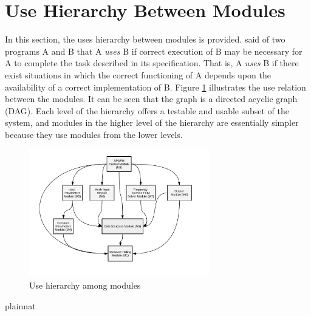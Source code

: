 \documentclass[12pt, titlepage]{article}
\begin{document}
	\section{Use Hierarchy Between Modules} \label{SecUse}
	
	In this section, the uses hierarchy between modules is provided.
	\citet{Parnas1978} said of two programs A and B that A {\em uses} B if correct
	execution of B may be necessary for A to complete the task described in its
	specification. That is, A {\em uses} B if there exist situations in which the
	correct functioning of A depends upon the availability of a correct
	implementation of B.  Figure \ref{FigUH} illustrates the use relation between
	the modules. It can be seen that the graph is a directed acyclic graph (DAG).
	Each level of the hierarchy offers a testable and usable subset of the system,
	and modules in the higher level of the hierarchy are essentially simpler
	because they use modules from the lower levels.
	
	\begin{figure}[H] \centering
		\includegraphics[width=0.7\textwidth]{MG-Chart.pdf} \caption{Use hierarchy
			among modules} \label{FigUH} \end{figure}
	
	
	 {plainnat} 
	
\end{document}

